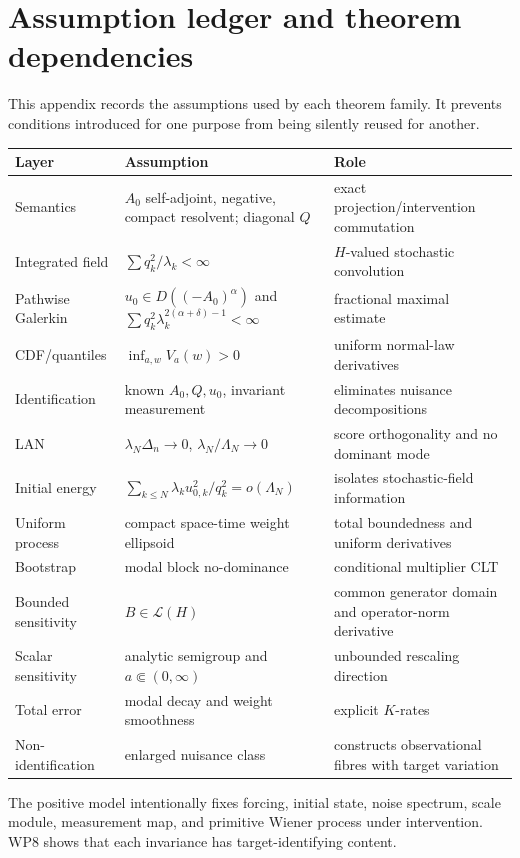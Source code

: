 \section{Assumption ledger and theorem dependencies}

This appendix records the assumptions used by each theorem family. It prevents conditions introduced for one purpose from being silently reused for another.

\begin{longtable}{p{}p{}p{}}
\toprule
Layer & Assumption & Role\\
\midrule
Semantics & $A_0$ self-adjoint, negative, compact resolvent; diagonal $Q$ & exact projection/intervention commutation\\
Integrated field & $\sum q_k^2/\lambda_k<\infty$ & $H$-valued stochastic convolution\\
Pathwise Galerkin & $u_0\in D((-A_0)^\alpha)$ and $\sum q_k^2\lambda_k^{2(\alpha+\delta)-1}<\infty$ & fractional maximal estimate\\
CDF/quantiles & $\inf_{a,w}V_a(w)>0$ & uniform normal-law derivatives\\
Identification & known $A_0,Q,u_0$, invariant measurement & eliminates nuisance decompositions\\
LAN & $\lambda_N\Delta_n\to0$, $\lambda_N/\Lambda_N\to0$ & score orthogonality and no dominant mode\\
Initial energy & $\sum_{k\le N}\lambda_ku_{0,k}^2/q_k^2=o(\Lambda_N)$ & isolates stochastic-field information\\
Uniform process & compact space-time weight ellipsoid & total boundedness and uniform derivatives\\
Bootstrap & modal block no-dominance & conditional multiplier CLT\\
Bounded sensitivity & $B\in\mathcal L(H)$ & common generator domain and operator-norm derivative\\
Scalar sensitivity & analytic semigroup and $a\Subset(0,\infty)$ & unbounded rescaling direction\\
Total error & modal decay and weight smoothness & explicit $K$-rates\\
Non-identification & enlarged nuisance class & constructs observational fibres with target variation\\
\bottomrule
\end{longtable}

The positive model intentionally fixes forcing, initial state, noise spectrum, scale module, measurement map, and primitive Wiener process under intervention. WP8 shows that each invariance has target-identifying content.
